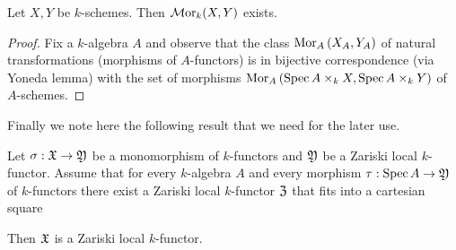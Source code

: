 \begin{fact}\label{fact:internal_hom_exists_for_schemes}
Let $X,Y$ be $k$-schemes. Then $\mathcal{M}\mathrm{or}_k(X,Y)$ exists. 
\end{fact}
\begin{proof}
Fix a $k$-algebra $A$ and observe that the class $\mathrm{Mor}_A\left(X_A,Y_A\right)$ of natural transformations (morphisms of $A$-functors) is in bijective correspondence (via Yoneda lemma) with the set of morphisms $\mathrm{Mor}_A\left(\mathrm{Spec}\, A\times_kX,\mathrm{Spec}\, A\times_kY\right)$ of $A$-schemes.
\end{proof}
\noindent
Finally we note here the following result that we need for the later use.

\begin{proposition}\label{proposition:representable_monomorphisms_are_sheaves}
Let $\sigma:{\mathfrak X} \rightarrow {\mathfrak Y}$ be a monomorphism of $k$-functors and ${\mathfrak Y}$ be a Zariski local $k$-functor. Assume that for every $k$-algebra $A$ and every morphism $\tau:\mathrm{Spec}\, A \rightarrow {\mathfrak Y}$ of $k$-functors there exist a Zariski local $k$-functor ${\mathfrak Z}$ that fits into a cartesian square
\begin{center}
\end{center}
Then ${\mathfrak X}$ is a Zariski local $k$-functor.
\end{proposition}
